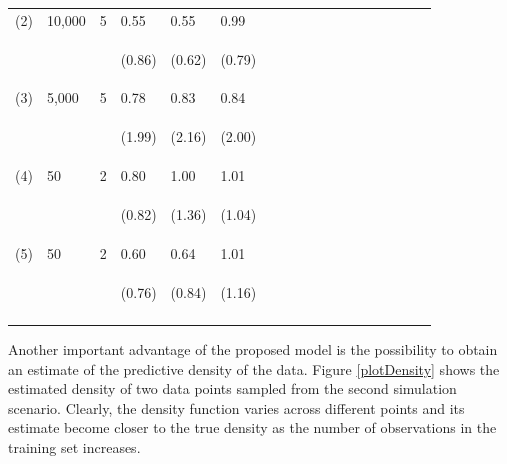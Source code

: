 \documentclass{article}
\begin{document}
\begin{table}[t]
\begin{center}
\begin{small}
\begin{sc}
\begin{tabular}{llllllllllllllllll}
(2)&10,000& 5&0.55& 0.55 &0.99\\ 
&&& \begin{scriptsize} (0.86)\end{scriptsize} & \begin{scriptsize} (0.62)\end{scriptsize} & \begin{scriptsize} (0.79)\end{scriptsize}\\
(3)&5,000 &5&  0.78 &0.83 & 0.84\\
&&&   \begin{scriptsize} (1.99)\end{scriptsize} & \begin{scriptsize} (2.16)\end{scriptsize} & \begin{scriptsize} (2.00)\end{scriptsize}\\
(4)&50&2& 0.80&1.00&1.01 \\
&&& \begin{scriptsize} (0.82)\end{scriptsize}& \begin{scriptsize} (1.36)\end{scriptsize}& \begin{scriptsize} (1.04)\end{scriptsize}\\
(5) &50&2 & 0.60&0.64 &1.01\\  
&&& \begin{scriptsize} (0.76)\end{scriptsize}& \begin{scriptsize} (0.84)\end{scriptsize}& \begin{scriptsize} (1.16)\end{scriptsize}\\
\\
\hline
\end{tabular}
\end{sc}
\end{small}
\end{center}
\vskip -0.1in
\end{table}

Another important advantage of the proposed model is the possibility to obtain an estimate of the predictive density of the data. Figure \ref{plotDensity} shows the estimated density of two data points sampled from the second simulation scenario. Clearly, the density function varies  across different points and its estimate become closer to the true density as the number of observations in the training set increases.
\end{document}

